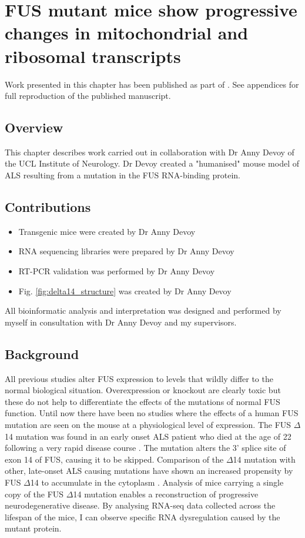\chapter{FUS mutant mice show progressive changes in mitochondrial and ribosomal transcripts}

\label{chapter:fus_mouse}

Work presented in this chapter has been published as part of \citep{Devoy2017}. See appendices for full reproduction of the published manuscript.

\section{Overview}
This chapter describes work carried out in collaboration with Dr Anny Devoy of the UCL Institute of Neurology. Dr Devoy created a "humanised" mouse model of ALS resulting from a mutation in the FUS RNA-binding protein. 

\section{Contributions}
\begin{itemize}
	\item Transgenic mice were created by Dr Anny Devoy
	\item RNA sequencing libraries were prepared by Dr Anny Devoy
	\item RT-PCR validation was performed by Dr Anny Devoy
	\item Fig. \ref{fig:delta14_structure} was created by Dr Anny Devoy
\end{itemize}
All bioinformatic analysis and interpretation was designed and performed by myself in consultation with Dr Anny Devoy and my supervisors. 


\section{Background}
All previous studies alter FUS expression to levels that wildly differ to the normal biological situation. Overexpression or knockout are clearly toxic but these do not help to differentiate the effects of the mutations of normal FUS function. Until now there have been no studies where the effects of a human FUS mutation are seen on the mouse at a physiological level of expression. 
The FUS $\Delta$14 mutation was found in an early onset ALS patient who died at the age of 22 following a very rapid disease course \citep{DeJesus-Hernandez2010}. The mutation alters the 3' splice site of exon 14 of FUS, causing it to be skipped.  Comparison of the $\Delta$14 mutation with other, late-onset ALS causing mutations have shown an increased propensity by FUS $\Delta$14 to accumulate in the cytoplasm \citep{Verbeeck2012}. Analysis of mice carrying a single copy of the FUS $\Delta$14 mutation enables a reconstruction of progressive neurodegenerative disease. By analysing RNA-seq data collected across the lifespan of the mice, I can observe specific RNA dysregulation caused by the mutant protein.

